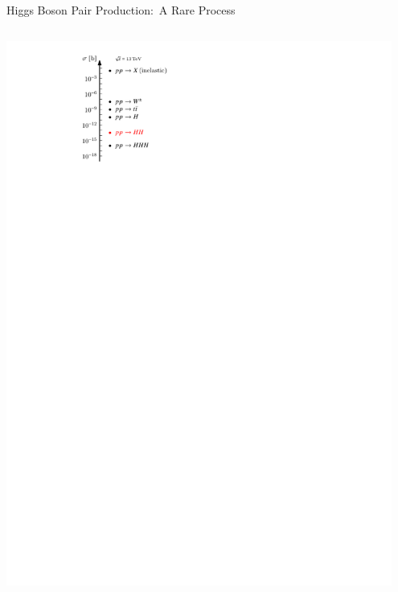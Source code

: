 \documentclass[11pt, xcolor={dvipsnames}, aspectratio=169]{beamer}
\begin{document}
\begin{frame}{Higgs Boson Pair Production:\ A Rare Process}

  \begin{columns}
    \centering

    \vspace*{1em} \includegraphics[width=0.95\textwidth]{cross_section_figure}


\end{columns}
\end{frame}
\end{document}
